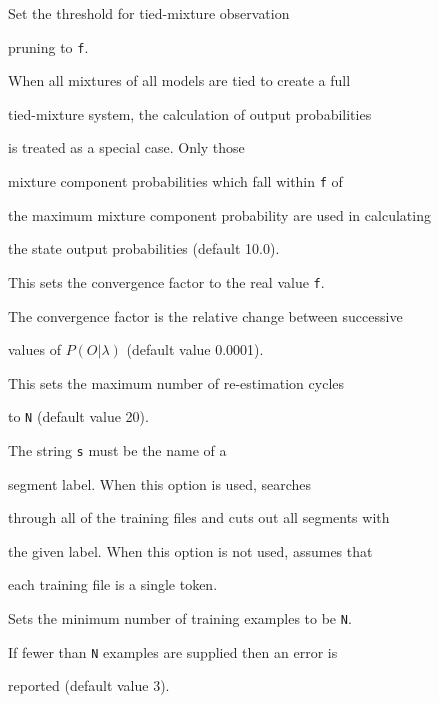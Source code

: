 \begin{optlist}


   Set the threshold for tied-mixture observation


      pruning to {\tt f}.


      When all mixtures of all models are tied to create a full


      tied-mixture system, the calculation of output probabilities


      is treated as a special case.  Only those 


      mixture component probabilities which fall within {\tt f} of


      the maximum mixture component probability are used in calculating


      the state output probabilities (default 10.0).





   This sets the convergence factor to the real value {\tt f}.


      The convergence factor is the relative change between successive


      values of $P({O}|\lambda)$ (default value 0.0001).





   This sets the maximum number of re-estimation cycles


      to {\tt N} (default value 20).





   The string {\tt s} must be the name of a


      segment label.  When this option is used,  searches


      through all of the training files and cuts out all segments with


      the given label.  When this option is not used,  assumes that


      each training file is a single token.





    Sets the minimum number of training examples to be {\tt N}.


      If fewer than {\tt N} examples are supplied then an error is


      reported (default value 3).






\end{optlist}

